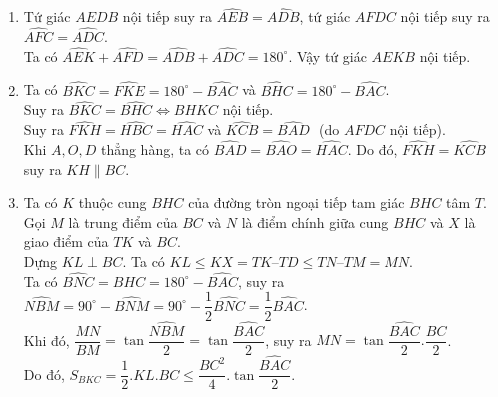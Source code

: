 \begin{ex}
{\begin{center}
\end{center}
\begin{enumerate}
\item Tứ giác $AEDB$ nội tiếp suy ra $\widehat{AEB}=\widehat{ADB}$, tứ giác $AFDC$ nội tiếp suy ra $\widehat{AFC}=\widehat{ADC}$.\\
Ta có $\widehat{AEK}+\widehat{AFD}=\widehat{ADB}+\widehat{ADC}=180^\circ$. Vậy tứ giác $AEKB$ nội tiếp.

\item Ta có $\widehat{BKC}=\widehat{FKE}=180^\circ -\widehat{BAC}$ và $\widehat{BHC}= 180^\circ - \widehat{BAC}$.\\
Suy ra $\widehat{BKC}=\widehat{BHC} \Leftrightarrow BHKC$ nội tiếp.\\
Suy ra $\widehat{FKH}=\widehat{HBC}=\widehat{HAC}$ và $\widehat{KCB}=\widehat{BAD}$\,\, (do $AFDC$ nội tiếp).\\
Khi $A, O, D$ thẳng hàng, ta có $\widehat{BAD}=\widehat{BAO}=\widehat{HAC}$. Do đó, $\widehat{FKH}=\widehat{KCB}$ suy ra $KH \parallel BC$.
\item Ta có $K$ thuộc cung $BHC$ của đường tròn ngoại tiếp tam giác $BHC$ tâm $T$. Gọi $M$ là trung điểm của $BC$ và $N$ là điểm chính giữa cung $BHC$ và $X$ là giao điểm của $TK$ và $BC$.\\
Dựng $KL \perp BC$. Ta có $KL \le KX = TK – TD \le TN – TM = MN$.\\
Ta có $\widehat{BNC}=\widehat{BHC}=180^\circ - \widehat{BAC}$, suy ra $\widehat{NBM}=90^\circ - \widehat{BNM}=90^\circ - \dfrac{1}{2}\widehat{BNC}=\dfrac{1}{2}\widehat{BAC}$.\\
Khi đó, $\dfrac{MN}{BM}=\tan \dfrac{\widehat{NBM}}{2}=\tan \dfrac{\widehat{BAC}}{2}$, suy ra $MN=\tan \dfrac{\widehat{BAC}}{2}.\dfrac{BC}{2}$.\\
Do đó, $S_{BKC}=\dfrac{1}{2}.KL.BC \le \dfrac{BC^2}{4}. \tan \dfrac{\widehat{BAC}}{2}$.


\end{enumerate}}
\end{ex}
